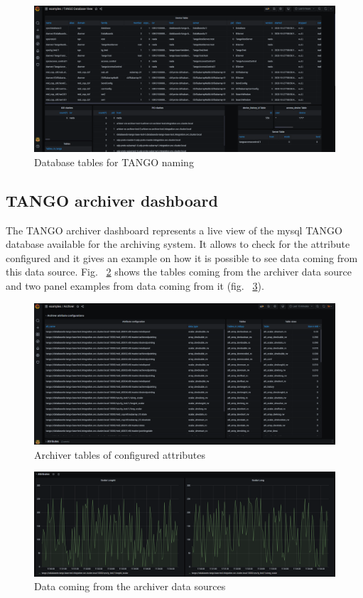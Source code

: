 \documentclass[]{spie}  %
\begin{document}
\begin{figure}[!htb]
   \centering
   \includegraphics*[width=0.6\columnwidth]{database_dash}
       \caption{Database tables for TANGO naming}
   \label{fig:database_dash}
\end{figure}

\subsection{TANGO archiver dashboard}
The TANGO archiver dashboard represents a live view of the mysql TANGO database available for the archiving system. It allows to check for the attribute configured and it gives an example on how it is possible to see data coming from this data source. Fig. ~\ref{fig:archiver1} shows the tables coming from the archiver data source and two panel examples from data coming from it (fig. ~\ref{fig:archiver2}).

\begin{figure}[!htb]
   \centering
   \includegraphics*[width=0.6\columnwidth]{archiver1}
       \caption{Archiver tables of configured attributes}
   \label{fig:archiver1}
\end{figure}

\begin{figure}[!htb]
   \centering
   \includegraphics*[width=0.6\columnwidth]{archiver2}
       \caption{Data coming from the archiver data sources}
   \label{fig:archiver2}
\end{figure}
\end{document}
